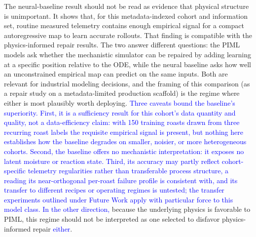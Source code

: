 \documentclass[fleqn,10pt]{wlscirep}
\newcommand{\rev}[1]{\textcolor{blue}{#1}}
\begin{document}
The neural-baseline result should not be read as evidence that physical structure is unimportant. It shows that, for this metadata-indexed cohort and information set, routine measured telemetry contains enough empirical signal for a compact autoregressive map to learn accurate rollouts. That finding is compatible with the physics-informed repair results. The two answer different questions: the PIML models ask whether the mechanistic simulator can be repaired by adding learning at a specific position relative to the ODE, while the neural baseline asks how well an unconstrained empirical map can predict on the same inputs. Both are relevant for industrial modeling decisions, and the framing of this comparison (as a repair study on a metadata-limited production scaffold) is the regime where either is most plausibly worth deploying. \rev{Three caveats bound the baseline's superiority. First, it is a sufficiency result for this cohort's data quantity and quality, not a data-efficiency claim: with 150 training roasts drawn from three recurring roast labels the requisite empirical signal is present, but nothing here establishes how the baseline degrades on smaller, noisier, or more heterogeneous cohorts. Second, the baseline offers no mechanistic interpretation: it exposes no latent moisture or reaction state. Third, its accuracy may partly reflect cohort-specific telemetry regularities rather than transferable process structure, a reading its near-orthogonal per-roast failure profile is consistent with, and its transfer to different recipes or operating regimes is untested; the transfer experiments outlined under Future Work apply with particular force to this model class.} \rev{In the other direction,} because the underlying physics is favorable to PIML, this regime should not be interpreted as one selected to disfavor physics-informed repair \rev{either}.
\end{document}
